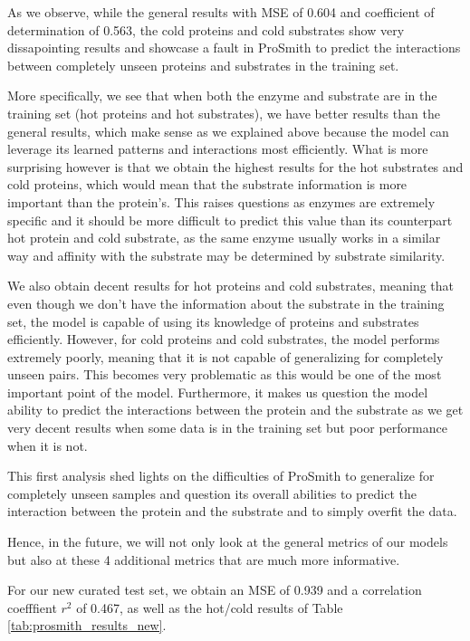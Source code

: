 As we observe, while the general results with MSE of 0.604 and coefficient of determination of 0.563, the cold proteins and cold substrates show very dissapointing results and showcase a fault in ProSmith to predict the interactions between completely unseen proteins and substrates in the training set.

More specifically, we see that when both the enzyme and substrate are in the training set (hot proteins and hot substrates), we have better results than the general results, which make sense as we explained above because the model can leverage its learned patterns and interactions most efficiently. What is more surprising however is that we obtain the highest results for the hot substrates and cold proteins, which would mean that the substrate information is more important than the protein's. This raises questions as enzymes are extremely specific and it should be more difficult to predict this value than its counterpart hot protein and cold substrate, as the same enzyme usually works in a similar way and affinity with the substrate may be determined by substrate similarity.

We also obtain decent results for hot proteins and cold substrates, meaning that even though we don't have the information about the substrate in the training set, the model is capable of using its knowledge of proteins and substrates efficiently. However, for cold proteins and cold substrates, the model performs extremely poorly, meaning that it is not capable of generalizing for completely unseen pairs. This becomes very problematic as this would be one of the most important point of the model. Furthermore, it makes us question the model ability to predict the interactions between the protein and the substrate as we get very decent results when some data is in the training set but poor performance when it is not.

This first analysis shed lights on the difficulties of ProSmith to generalize for completely unseen samples and question its overall abilities to predict the interaction between the protein and the substrate and to simply overfit the data.

Hence, in the future, we will not only look at the general metrics of our models but also at these 4
additional metrics that are much more informative.

For our new curated test set, we obtain an MSE of 0.939 and a correlation coefffient $r^2$ of 0.467, as well as the hot/cold results of Table \ref{tab:prosmith_results_new}.

